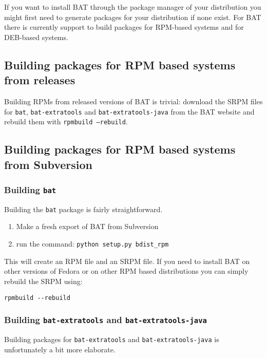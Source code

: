 \documentclass[10pt,a4paper]{article}
\begin{document}
If you want to install BAT through the package manager of your distribution you
might first need to generate packages for your distribution if none exist. For
BAT there is currently support to build packages for RPM-based systems and for
DEB-based systems.

\subsection{Building packages for RPM based systems from releases}

Building RPMs from released versions of BAT is trivial: download the SRPM
files for \texttt{bat}, \texttt{bat-extratools} and
\texttt{bat-extratools-java} from the BAT website and rebuild them with
\texttt{rpmbuild --rebuild}.

\subsection{Building packages for RPM based systems from Subversion}

\subsubsection{Building \texttt{bat}}

Building the \texttt{bat} package is fairly straightforward.

\begin{enumerate}
\item Make a fresh export of BAT from Subversion
\item run the command: \texttt{python setup.py bdist\_rpm}
\end{enumerate}

This will create an RPM file and an SRPM file. If you need to install BAT on
other versions of Fedora or on other RPM based distributions you can simply
rebuild the SRPM using:

\begin{verbatim}
rpmbuild --rebuild
\end{verbatim}

\subsubsection{Building \texttt{bat-extratools} and
\texttt{bat-extratools-java}}

Building packages for \texttt{bat-extratools} and \texttt{bat-extratools-java}
is unfortunately a bit more elaborate.
\end{document}
